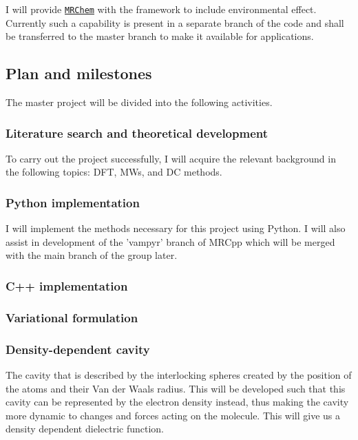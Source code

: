 \documentclass[a4paper,11pt]{article}
\newcommand{\mrchem}{\href{https://mrchem.readthedocs.io/en/latest/}{\texttt{MRChem}}}
\begin{document}
I will provide \mrchem{} with the
framework to include environmental effect. Currently such a capability
is present in a separate branch of the code and shall be transferred
to the master branch to make it available for applications.

\subsection{Plan and milestones}

The master project will be divided into the following activities.

\subsubsection{Literature search and theoretical development}

To carry out the project successfully, I will acquire the relevant
background in the following topics: \acl{DFT}, \aclp{MW}, and \acl{DC}
methods.

\subsubsection{Python implementation}

I will implement the methods necessary for this project using Python. I will also assist in development of the 'vampyr' branch of MRCpp which will be merged with the main branch of the group later.

\subsubsection{C++ implementation}

\subsubsection{Variational formulation}

\subsubsection{Density-dependent cavity}

The cavity that is described by the interlocking spheres created by the position of the atoms and their Van der Waals radius. This will be developed such that this cavity can be represented by the electron density instead, thus making the cavity more dynamic to changes and forces acting on the molecule. This will give us a density dependent dielectric function.
\end{document}
